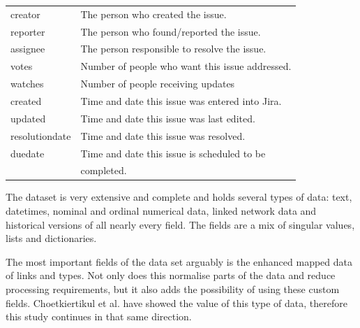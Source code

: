 \documentclass[sigconf]{acmart}
\begin{document}
\begin{table}[h!]
\begin{tabular}{l l}
 creator & The person who created the issue. \\
 reporter & The person who found/reported the issue. \\
 assignee & The person responsible to resolve the issue. \\
 votes & Number of people who want 
 this issue addressed. \\
 watches & Number of people receiving updates \\
 created & Time and date this issue was entered into Jira. \\
 updated & Time and date this issue was last edited. \\
 resolutiondate & Time and date this issue was resolved. \\
 duedate & Time and date this issue is scheduled to be \\
 & completed. \\ [2ex] 
 \hline
 \end{tabular}
\end{table}

The dataset is very extensive and complete and holds several types of data: text, datetimes, nominal and ordinal numerical data, linked network data and historical versions of all nearly every field.
The fields are a mix of singular values, lists and dictionaries.

The most important fields of the data set arguably is the enhanced mapped data of links and types.
Not only does this normalise parts of the data and reduce processing requirements, but it also adds the possibility of using these custom fields. Choetkiertikul et al. \cite{choetkiertikul2017predicting}
have showed the value of this type of data, therefore this study continues in that same direction.
\end{document}
